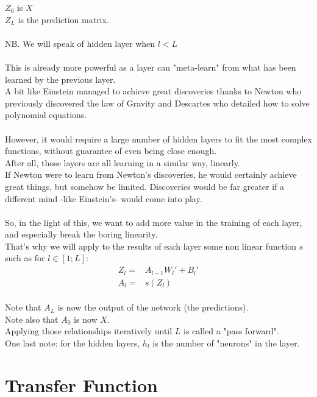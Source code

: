 \documentclass[]{article}
\begin{document}
$Z_0$ is $X$\\
$Z_L$ is the prediction matrix.\\
\\
NB. We will speak of hidden layer when $l<L$\\
\\
This is already more powerful as a layer can "meta-learn" from what has been learned by the previous layer.\\
A bit like Einstein managed to achieve great discoveries thanks to Newton who previously discovered the law of Gravity and Descartes who detailed how to solve polynomial equations.\\
\\
However, it would require a large number of hidden layers to fit the most complex functions, without guarantee of even being close enough.\\
After all, those layers are all learning in a similar way, linearly.\\
If Newton were to learn from Newton's discoveries, he would certainly achieve great things, but somehow be limited. Discoveries would be far greater if a different mind -like Einstein's- would come into play.\\
\\
So, in the light of this, we want to add more value in the training of each layer, and especially break the boring linearity.\\
That's why we will apply to the results of each layer some non linear function $s$ such as for $l \in [1;L]$:\\

\begin{align}
Z_l=&A_{l-1}W_{l}'+B_{l}' \label{eq:fwdZ} \\ 
A_l=&s(Z_{l}) \label{eq:fwdA}
\end{align}
\\
Note that $A_L$ is now the output of the network (the predictions).\\
Note also that $A_0$ is now $X$.\\
Applying those relationships iteratively until $L$ is called a "pass forward".\\
One last note: for the hidden layers, $h_l$ is the number of "neurons" in the layer.\\

\section{Transfer Function}
\end{document}
